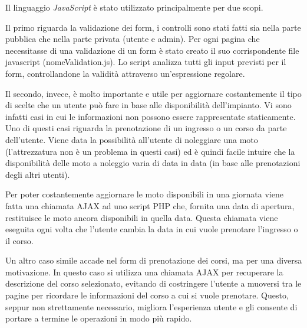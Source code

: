 Il linguaggio \textit{JavaScript} è stato utilizzato principalmente per due scopi.

Il primo riguarda la validazione dei form, i controlli sono stati fatti sia nella parte pubblica che nella parte privata (utente e admin). Per ogni pagina che necessitasse di una validazione di un form è stato creato il suo corrispondente file javascript (nomeValidation.js). Lo script analizza tutti gli input previsti per il form, controllandone la validità attraverso un'espressione regolare.
    
Il secondo, invece, è molto importante e utile per aggiornare costantemente il tipo di scelte che un utente può fare in base alle disponibilità dell'impianto. Vi sono infatti casi in cui le informazioni non possono essere rappresentate staticamente. Uno di questi casi riguarda la prenotazione di un ingresso o un corso da parte dell'utente. Viene data la possibilità all'utente di noleggiare una moto (l'attrezzatura non è un problema in questi casi) ed è quindi facile intuire che la disponibilità delle moto a noleggio varia di data in data (in base alle prenotazioni degli altri utenti).

Per poter costantemente aggiornare le moto disponibili in una giornata viene fatta una chiamata AJAX ad uno script PHP che, fornita una data di apertura, restituisce le moto ancora disponibili in quella data. Questa chiamata viene eseguita ogni volta che l'utente cambia la data in cui vuole prenotare l'ingresso o il corso.

Un altro caso simile accade nel form di prenotazione dei corsi, ma per una diversa motivazione. In questo caso si utilizza una chiamata AJAX per recuperare la descrizione del corso selezionato, evitando di costringere l'utente a muoversi tra le pagine per ricordare le informazioni del corso a cui si vuole prenotare. Questo, seppur non strettamente necessario, migliora l'esperienza utente e gli consente di portare a termine le operazioni in modo più rapido.
 